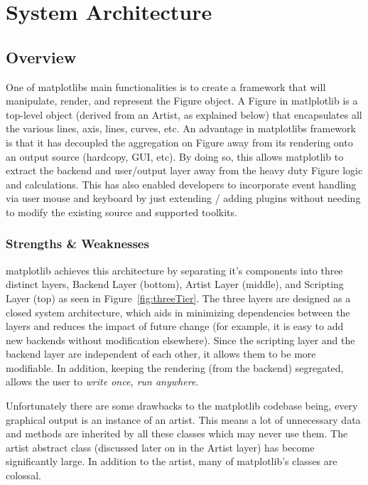 \documentclass[pdftex,10pt,a4paper]{report}
\begin{document}

\chapter{System Architecture}

\section{Overview}

One of matplotlibs main functionalities is to create a framework that will manipulate, render, and represent the Figure object. A Figure in matlplotlib is a top-level object (derived from an Artist, as explained below) that encapsulates all the various lines, axis, lines, curves, etc. An advantage in matplotlibs framework is that it has decoupled the aggregation on Figure away from its rendering onto an output source (hardcopy, GUI, etc). By doing so, this allows matplotlib to extract the backend and user/output layer away from the heavy duty Figure logic and calculations. This has also enabled developers to incorporate event handling via user mouse and keyboard by just extending / adding plugins without needing to modify the existing source and supported toolkits. 

\subsection{Strengths \& Weaknesses}

matplotlib achieves this architecture by separating it's components into three distinct layers, Backend Layer (bottom), Artist Layer (middle), and Scripting Layer (top) as seen in Figure~\ref{fig:threeTier}. The three layers are designed as a closed system architecture, which aids in minimizing dependencies between the layers and reduces the impact of future change (for example, it is easy to add new backends without modification elsewhere). Since the scripting layer and the backend layer are independent of each other, it allows them to be more modifiable. In addition, keeping the rendering (from the backend) segregated, allows the user to {\it write once, run anywhere}.

Unfortunately there are some drawbacks to the matplotlib codebase being, every graphical output is an instance of an artist. This means a lot of unnecessary data and methods are inherited by all these classes which may never use them. The artist abstract class (discussed later on in the Artist layer) has become significantly large. In addition to the artist, many of matplotlib's classes are colossal.
\end{document}
